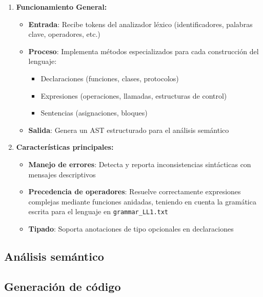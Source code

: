 \documentclass{article}
\begin{document}
\begin{enumerate}
  \item \textbf{Funcionamiento General:}
  \begin{itemize}
    \item \textbf{Entrada}: Recibe tokens del analizador léxico (identificadores, palabras clave, operadores, etc.)
    
    \item \textbf{Proceso}: Implementa métodos especializados para cada construcción del lenguaje:
    \begin{itemize}
        \item Declaraciones (funciones, clases, protocolos)
        \item Expresiones (operaciones, llamadas, estructuras de control)
        \item Sentencias (asignaciones, bloques)
    \end{itemize}
    
    \item \textbf{Salida}: Genera un AST estructurado para el análisis semántico
  \end{itemize}
  \item \textbf{Características principales:}
  \begin{itemize}
      \item \textbf{Manejo de errores}: Detecta y reporta inconsistencias sintácticas con mensajes descriptivos
      \item \textbf{Precedencia de operadores}: Resuelve correctamente expresiones complejas mediante funciones anidadas, teniendo en cuenta la gramática escrita para el lenguaje en \texttt{grammar\_LL1.txt}
      \item \textbf{Tipado}: Soporta anotaciones de tipo opcionales en declaraciones
  \end{itemize}
\end{enumerate}

\subsection{Análisis semántico}

\subsection{Generación de código}
\end{document}
